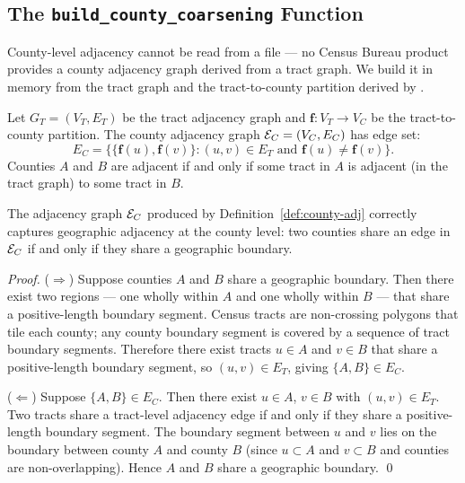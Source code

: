 \subsection{The \texttt{build\_county\_coarsening} Function}

County-level adjacency cannot be read from a file --- no Census Bureau
product provides a county adjacency graph derived from a tract graph.
We build it in memory from the tract graph and the tract-to-county
partition derived by \derive{}.

\begin{definition}
\label{def:county-adj}
Let $G_T = (V_T, E_T)$ be the tract adjacency graph and
$\mathbf{f}: V_T \to V_C$ be the tract-to-county partition.
The county adjacency graph $\mathcal{E}_C = (V_C, E_C)$ has edge set:
\[
  E_C = \bigl\{\{\mathbf{f}(u), \mathbf{f}(v)\} :
               (u, v) \in E_T \text{ and } \mathbf{f}(u) \neq \mathbf{f}(v)\bigr\}.
\]
Counties $A$ and $B$ are adjacent if and only if some tract in $A$
is adjacent (in the tract graph) to some tract in $B$.
\end{definition}

\begin{theorem}
\label{thm:county-adj}
The adjacency graph $\mathcal{E}_C$ produced by Definition~\ref{def:county-adj}
correctly captures geographic adjacency at the county level: two counties
share an edge in $\mathcal{E}_C$ if and only if they share a geographic boundary.
\end{theorem}

\begin{proof}
($\Rightarrow$) Suppose counties $A$ and $B$ share a geographic boundary.
Then there exist two regions --- one wholly within $A$ and one wholly
within $B$ --- that share a positive-length boundary segment.
Census tracts are non-crossing polygons that tile each county; any
county boundary segment is covered by a sequence of tract boundary
segments.
Therefore there exist tracts $u \in A$ and $v \in B$ that share a
positive-length boundary segment, so $(u, v) \in E_T$, giving
$\{A, B\} \in E_C$.

($\Leftarrow$) Suppose $\{A, B\} \in E_C$.
Then there exist $u \in A$, $v \in B$ with $(u,v) \in E_T$.
Two tracts share a tract-level adjacency edge if and only if they share
a positive-length boundary segment.
The boundary segment between $u$ and $v$ lies on the boundary between
county $A$ and county $B$ (since $u \subset A$ and $v \subset B$
and counties are non-overlapping).
Hence $A$ and $B$ share a geographic boundary. \qed
\end{proof}

